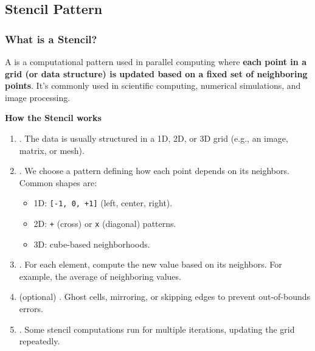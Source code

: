 \subsection{Stencil Pattern}\label{subsection: Stencil Pattern}

\subsubsection{What is a Stencil?}

A  is a computational pattern used in parallel computing where \textbf{each point in a grid (or data structure) is updated based on a fixed set of neighboring points}. It's commonly used in scientific computing, numerical simulations, and image processing.

\highspace
\begin{flushleft}
    \textcolor{Green3}{ \textbf{How the Stencil works}}
\end{flushleft}
\begin{enumerate}
    \item {}. The data is usually structured in a 1D, 2D, or 3D grid (e.g., an image, matrix, or mesh).
    
    \item {}. We choose a pattern defining how each point depends on its neighbors. Common shapes are:
    \begin{itemize}
        \item 1D: \texttt{[-1, 0, +1]} (left, center, right).
        \item 2D: \texttt{+} (cross) or \texttt{x} (diagonal) patterns.
        \item 3D: cube-based neighborhoods.
    \end{itemize}

    \item {}. For each element, compute the new value based on its neighbors. For example, the average of neighboring values.

    \item (optional) . Ghost cells, mirroring, or skipping edges to prevent out-of-bounds errors.

    \item {}. Some stencil computations run for multiple iterations, updating the grid repeatedly.
\end{enumerate}

